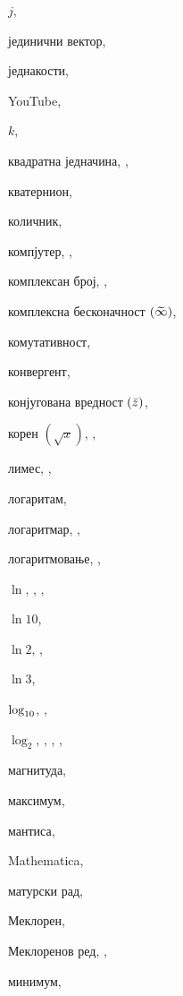 \begin{theindex}
  \indexspace

  \item $j$, 
  \item јединични вектор, 
  \item једнакости, 
  \interskip
  \item {\sf  YouTube}, 

  \indexspace

  \item $k$, 
  \item квадратна једначина, , 
  \item кватернион, 
  \item количник, 
  \item компјутер, , 
  \item комплексан број, , 
  \item комплексна бесконачност $({\,\widetilde{\!\infty\!}\,})$, 
  \item комутативност, 
  \item конвергент, 
  \item конјугована вредност $({\bar z})$, 
  \item корен $(\sqrt x)$, , 

  \indexspace

  \item лимес, , 
  \item логаритам, 
  \item логаритмар, , 
  \item логаритмовање, , 
  \interskip
  \item $\ln$, , , 
  \item $\ln 10$, 
  \item $\ln 2$, , 
  \item $\ln3$, 
  \item $\log_{10}$, , 
  \item $\log_2$, , , , 

  \indexspace

  \item магнитуда, 
  \item максимум, 
  \item мантиса, 
  \item Mathematica, 
  \item матурски рад, 
  \item Меклорен, 
  \item Меклоренов ред, , 
  \item минимум, 


\end{theindex}
